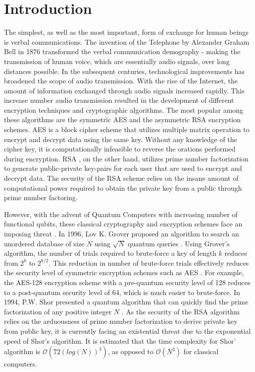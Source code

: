 \documentclass{article}
\begin{document}
\section{Introduction}
\label{sec:introduction}
The simplest, as well as the most important, form of exchange for human beings is verbal communications. The invention of the Telephone by Alexander Graham Bell in 1876 transformed the verbal communication demography - making the transmission of human voice, which are essentially audio signals, over long distances possible. In the subsequent centuries, technological improvements has broadened the scope of audio transmission. With the rise of the Internet, the amount of information exchanged through audio signals increased rapidly. This increase number audio transmission resulted in the development of different encryption techniques and cryptographic algorithms. The most popular among these algorithms are the symmetric AES and the asymmetric RSA encryption schemes. AES \cite{rijmen2001advanced} is a block cipher scheme that utilizes multiple matrix operation to encrypt and decrypt data using the same key. Without any knowledge of the cipher key, it is computationally infeasible to reverse the orations performed during encryption. RSA \cite{rivest1978method}, on the other hand, utilizes prime number factorization to generate public-private key-pairs for each user that are used to encrypt and decrypt data. The security of the RSA scheme relies on the insane amount of computational power required to obtain the private key from a public through prime number factoring.

However, with the advent of Quantum Computers with increasing number of functional qubits, these classical cryptography and encryption schemes face an imposing threat \cite{bernstein2017post}. In 1996, Lov K. Grover proposed an algorithm to search an unordered database of size $N$ using $\sqrt{N}$ quantum queries \cite{grover1996fast}. Using Grover's algorithm, the number of trials required to brute-force a key of length $k$ reduces from $2^{k}$ to $2^{k/2}$. This reduction in number of brute-force trials effectively reduces the security level of symmetric encryption schemes such as AES \cite{Daemen2002}. For example, the AES-128 encryption scheme with a pre-quantum security level of 128 reduces to a post-quantum security level of 64, which is much easier to brute-force. In 1994, P.W. Shor presented a quantum algorithm that can quickly find the prime factorization of any positive integer $N$ \cite{Shor1997}. As the security of the RSA algorithm relies on the arduousness of prime number factorization to derive private key from public key, it is currently facing an existential threat due to the exponential speed of Shor's algorithm. It is estimated that the time complexity for Shor' algorithm is $\mathcal{O}(72(log(N))^{3})$, as opposed to $\mathcal{O}(N^3)$ for classical computers.
\end{document}
